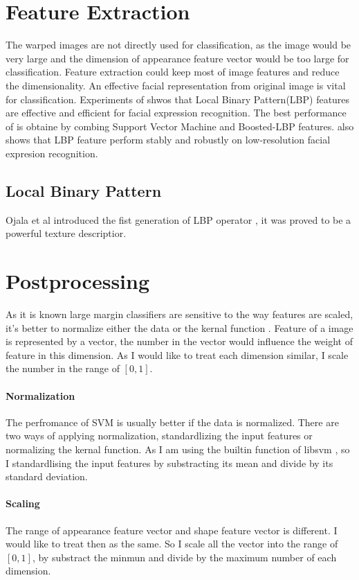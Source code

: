 \section{Feature Extraction}
The warped images are not directly used for classification, as the image would be very large and the dimension of appearance feature vector would be too large for classification. Feature extraction could keep most of image features and reduce the dimensionality. An effective facial representation from original image is vital for classification. Experiments of \cite{shan2009facial} shwos that Local Binary Pattern(LBP) features are effective and efficient for facial expression recognition. The best performance of \cite{shan2009facial} is obtaine by combing Support Vector Machine and Boosted-LBP features. \cite{shan2009facial} also shows that LBP feature perform stably and robustly on low-resolution facial expresion recognition. 
\subsection{Local Binary Pattern}
Ojala et al introduced the fist generation of LBP operator \cite{shan2009facial}, it was proved to be a powerful texture descriptior. 
\newpage
\section{Postprocessing}
As it is known large margin classifiers are sensitive to the way features are scaled, it's better to normalize either the data or the kernal function \cite{ben2010user}. Feature of a image is represented by a vector, the number in the vector would influence the weight of feature in this dimension. As I would like to treat each dimension similar, I scale the number in the range of $[0,1]$.
\paragraph{Normalization}
The perfromance of SVM is usually better if the data is normalized. There are two ways of applying normalization, standardlizing the input features or normalizing the kernal function. As I am using the builtin function of libsvm \cite{CC01a}, so I standardlising the input features by substracting its mean and divide by its standard deviation.
\paragraph{Scaling}
The range of appearance feature vector and shape feature vector is different. I would like to treat then as the same. So I scale all the vector into the range of $[0, 1]$, by substract the minmun and divide by the maximum number of each dimension.